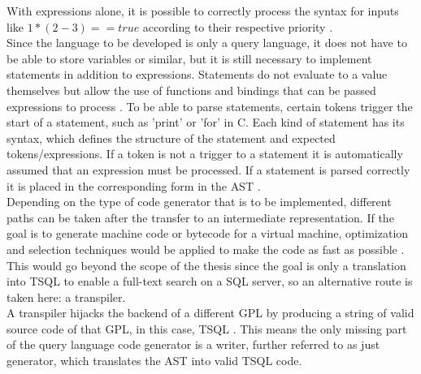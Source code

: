 With expressions alone, it is possible to correctly process the syntax for inputs like $1 * (2 - 3) == true$ according to their respective priority \parencite[cf.][p. 64]{nystrom_crafting_2021}.\\
Since the language to be developed is only a query language, it does not have to be able to store variables or similar, but it is still necessary to implement statements in addition to expressions. Statements do not evaluate to a value themselves but allow the use of functions and bindings that can be passed expressions to process \parencite[cf.][pp. 111-112]{nystrom_crafting_2021}. To be able to parse statements, certain tokens trigger the start of a statement, such as 'print' or 'for' in C. Each kind of statement has its syntax, which defines the structure of the statement and expected tokens/expressions. If a token is not a trigger to a statement it is automatically assumed that an expression must be processed. If a statement is parsed correctly it is placed in the corresponding form in the \ac{AST} \parencite[cf.][pp. 113-116]{nystrom_crafting_2021}.\\
Depending on the type of code generator that is to be implemented, different paths can be taken after the transfer to an intermediate representation. If the goal is to generate machine code or bytecode for a virtual machine, optimization and selection techniques would be applied to make the code as fast as possible \parencite[cf.][p. 15]{nystrom_crafting_2021}.\\
This would go beyond the scope of the thesis since the goal is only a translation into \ac{TSQL} to enable a full-text search on a \ac{SQL} server, so an alternative route is taken here: a transpiler.\\
A transpiler hijacks the backend of a different \ac{GPL} by producing a string of valid source code of that \ac{GPL}, in this case, \ac{TSQL} \parencite[cf.][p. 17]{nystrom_crafting_2021}. This means the only missing part of the query language code generator is a writer, further referred to as just generator, which translates the \ac{AST} into valid \ac{TSQL} code.